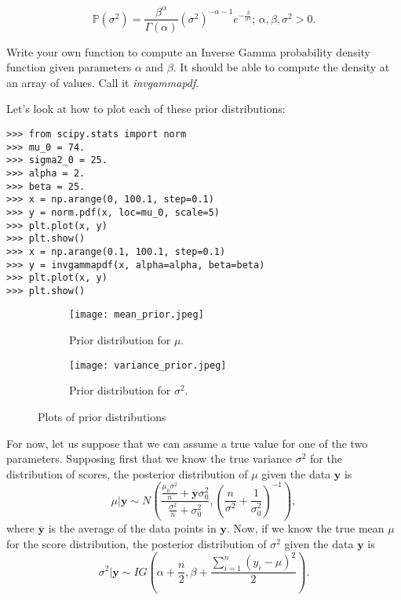 $$\mathbb{P}(\sigma^{2}) = \frac{\beta^{\alpha}}{\Gamma(\alpha)}(\sigma^{2})^{-\alpha - 1}e^{-\frac{\beta}{\sigma^{2}}}\text{; } \alpha,\beta,\sigma^2 >0.$$

\begin{problem}
Write your own function to compute an Inverse Gamma probability density function given parameters $\alpha$ and $\beta$. It should be able to compute the density at an array of values. Call it \emph{invgammapdf}.
\end{problem}

Let's look at how to plot each of these prior distributions:

\begin{lstlisting}
>>> from scipy.stats import norm
>>> mu_0 = 74.
>>> sigma2_0 = 25.
>>> alpha = 2.
>>> beta = 25.
>>> x = np.arange(0, 100.1, step=0.1)
>>> y = norm.pdf(x, loc=mu_0, scale=5)
>>> plt.plot(x, y)
>>> plt.show()
>>> x = np.arange(0.1, 100.1, step=0.1)
>>> y = invgammapdf(x, alpha=alpha, beta=beta)
>>> plt.plot(x, y)
>>> plt.show()
\end{lstlisting}

\begin{figure}[h]
\centering
\begin{subfigure}[b]{.49\textwidth}
\texttt{[image: mean\_prior.jpeg]}
\caption{Prior distribution for $\mu$.}
\end{subfigure}
\begin{subfigure}[b]{.49\textwidth}
\texttt{[image: variance\_prior.jpeg]}
\caption{Prior distribution for $\sigma^{2}$.}
\end{subfigure}
\caption{Plots of prior distributions}
\end{figure}

For now, let us suppose that we can assume a true value for one of the two parameters. Supposing first that we know the true variance $\sigma^{2}$ for the distribution of scores, the posterior distribution of $\mu$ given the data $\mathbf{y}$ is
$$\mu | \mathbf{y} \sim N\left(\frac{\frac{\mu_{0}\sigma^{2}}{n} + \overline{\mathbf{y}}\sigma_{0}^{2}}{\frac{\sigma^{2}}{n} + \sigma_{0}^{2}}, \left(\frac{n}{\sigma^{2}} + \frac{1}{\sigma_{0}^{2}}\right)^{-1}\right),$$
where $\overline{\mathbf{y}}$ is the average of the data points in $\mathbf{y}$. Now, if we know the true mean $\mu$ for the score distribution, the posterior distribution of $\sigma^{2}$ given the data $\mathbf{y}$ is $$\sigma^{2} | \mathbf{y} \sim IG \left(\alpha + \frac{n}{2}, \beta + \frac{\sum_{i=1}^{n} (y_{i} - \mu)^{2}}{2}\right).$$

